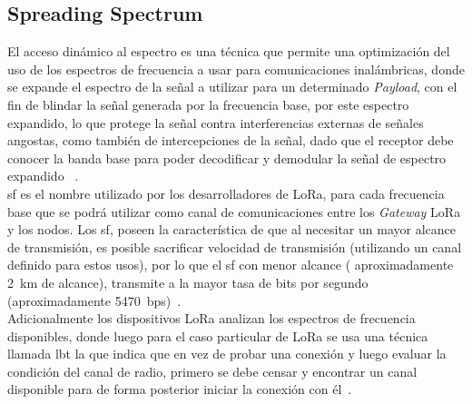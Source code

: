 \begin{justify}
\section{Spreading Spectrum}
El acceso dinámico al espectro es una técnica que permite una optimización del uso de los espectros de frecuencia a usar para comunicaciones inalámbricas, donde se expande el espectro de la señal a utilizar para un determinado \textit{Payload}, con el fin de blindar la señal generada por la frecuencia base, por este espectro expandido, lo que protege la señal contra interferencias externas de señales angostas, como también de intercepciones de la señal, dado que el receptor debe conocer la banda base para poder decodificar y demodular la señal de espectro expandido ~\cite{modulation}.\\
\gls{sf} es el nombre utilizado por los desarrolladores de LoRa, para cada frecuencia base que se podrá utilizar como canal de comunicaciones entre los \textit{Gateway} LoRa y los nodos. Los \gls{sf}, poseen la característica de que al necesitar un mayor alcance de transmisión, es posible sacrificar velocidad de transmisión (utilizando un canal definido para estos usos), por lo que el \gls{sf} con menor alcance ( aproximadamente \SI{2}{\kilo\meter} de alcance), transmite a la mayor tasa de bits por segundo (aproximadamente \SI{5470}{bps})~\cite{orange}.\\
Adicionalmente los dispositivos LoRa analizan los espectros de frecuencia disponibles, donde luego para el caso particular de LoRa se usa una técnica llamada \gls{lbt} la que indica que en vez de probar una conexión y luego evaluar la condición del canal de radio, primero se debe censar y encontrar un canal disponible para de forma posterior iniciar la conexión con él~\cite{modulation}.

\end{justify}
